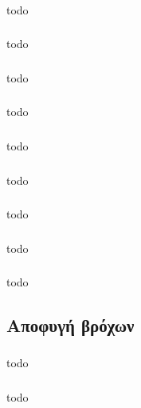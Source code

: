 \documentclass[a4paper, 12pt]{article}
\begin{document}
		\subsubsection{}
			todo
		
		\subsubsection{}
			todo
		
		\subsubsection{}
			todo
		
		\subsubsection{}
			todo
		
		\subsubsection{}
			todo
		
		\subsubsection{}
			todo
		
		\subsubsection{}
			todo
		
		\subsubsection{}
			todo
		
		\subsubsection{}
			todo

	\subsection{Αποφυγή βρόχων}

		\subsubsection{}
			todo

		\subsubsection{}
			todo
\end{document}

